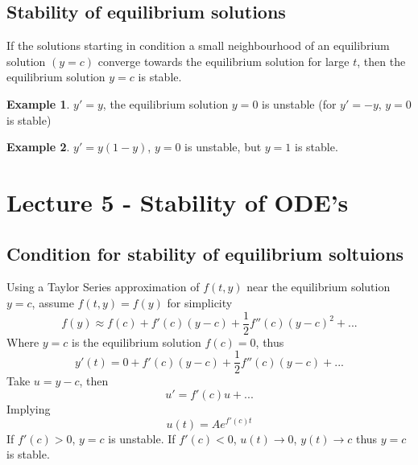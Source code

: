 \documentclass{report}
\theoremstyle{definition}
\newtheorem{example}{Example}
\theoremstyle{plain}
\theoremstyle{remark}
\begin{document}
      \subsection{Stability of equilibrium solutions}
      If the solutions starting in condition a small neighbourhood of an
      equilibrium solution $ (y = c) $ converge towards the equilibrium solution
      for large $ t $, then the equilibrium solution $ y = c $ is stable.

      \begin{example}
	$ y' = y $, the equilibrium solution $ y = 0 $ is unstable (for $ y'
	= -y $, $ y = 0 $ is stable)
      \end{example}

      \begin{example}
	$ y' = y(1-y) $, $ y = 0 $ is unstable, but $ y = 1 $ is stable.
      \end{example}


\section{Lecture 5 - Stability of ODE's}
\subsection{Condition for stability of equilibrium soltuions}
Using a Taylor Series approximation of $ f(t,y) $ near the equilibrium solution
$ y = c $, assume $ f(t,y) = f(y) $ for simplicity
$$ f(y) \approx f(c) + f'(c)(y-c) + \frac{1}{2} f''(c)(y-c)^2 + ... $$
Where $ y = c  $ is the equilibrium solution $ f(c) = 0 $, thus
$$ y'(t) = 0 + f'(c)(y-c) + \frac{1}{2} f''(c)(y-c) + ... $$
Take $ u = y -c $, then $$ u' = f'(c)u + ... $$
Implying
$$ u(t) = Ae^{f'(c) t} $$
If $ f'(c) > 0 $, $ y = c $ is unstable. If $ f'(c) < 0 $, $ u(t) \to 0 $,
$ y(t) \to c $ thus $ y =c  $ is stable.
\end{document}
